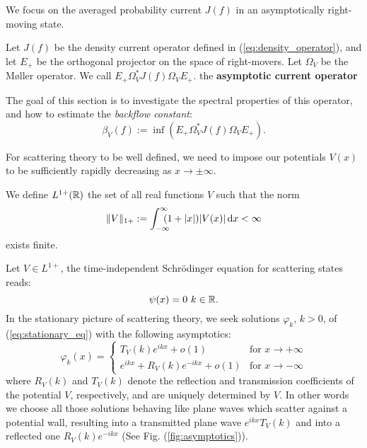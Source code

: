 We focus on the averaged probability current $J(f)$ in an asymptotically right-moving state.

\begin{definition}
	Let $J(f)$ be the density current operator defined in (\ref{eq:density_operator}), and let $E_+$  be the orthogonal projector on the space of right-movers. Let $\Omega_V$  be the M\o{}ller operator. We call $E_+\Omega_V^*J(f)\Omega_VE_+.$  the \textbf{asymptotic current operator}
\end{definition}
\begin{rem}
	The goal of this section is to investigate the spectral properties of this operator, and how to estimate the \textit{backflow constant}:
	\begin{equation}
	\beta_V(f):=\inf(E_+\Omega_V^*J(f)\Omega_VE_+).
	\end{equation}
\end{rem}
For scattering theory to be well defined, we need to impose our potentials $V(x)$ to be sufficiently rapidly decreasing as $x\to\pm\infty$.
\begin{definition}
	We define $L^{1+}({\mathbb R})$ the set of all real functions $V$ such that the norm
	\begin{equation}
		\|V\|_{1+}:=\int_{-\infty}^{\infty}\!\!\!\! (1+|x|)|V(x)|\, \mathrm d x < \infty
	\end{equation}
	exists finite.
\end{definition}
\begin{oss}
Let  $V\in L^{1+}$, the time-independent Schr\"{o}dinger equation for scattering states reads:
	\begin{equation}
	[-\partial_x^2+2V(x)-k^2]\psi(x)=0\ k\in\mR.
	\label{eq:stationary_eq}
	\end{equation}
	In the stationary picture of scattering theory, we seek solutions $\varphi_k$, $k>0$, of (\ref{eq:stationary_eq}) with the following asymptotics:
	\begin{equation}
	\label{eq:asymptotics}
	\varphi_k(x)=\begin{cases}
	T_V(k)e^{ikx}+o(1) & \text{for }  x\to+\infty\\
	e^{ikx}+R_V(k)e^{-ikx}+o(1) & \text{for } x\to-\infty
	\end{cases}
	\end{equation}
	where $R_V(k)$ and $T_V(k)$ denote the reflection and transmission coefficients of the potential $V$, respectively, and are uniquely determined by $V$. In other words we choose all those solutions behaving like plane waves which scatter against a potential wall, resulting into a transmitted plane wave $e^{ikx}T_V(k)$ and into a reflected one $R_V(k)e^{-ikx}$ (See Fig. (\ref{fig:asymptotics})).
\end{oss}
